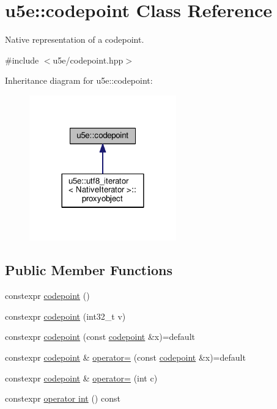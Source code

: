 \hypertarget{classu5e_1_1codepoint}{}\section{u5e\+:\+:codepoint Class Reference}
\label{classu5e_1_1codepoint}


Native representation of a codepoint.  




{\ttfamily \#include $<$u5e/codepoint.\+hpp$>$}



Inheritance diagram for u5e\+:\+:codepoint\+:
\nopagebreak
\begin{figure}[H]
\begin{center}
\leavevmode
\includegraphics[width=180pt]{classu5e_1_1codepoint__inherit__graph}
\end{center}
\end{figure}
\subsection*{Public Member Functions}
\begin{DoxyCompactItemize}
\item 
constexpr \hyperlink{classu5e_1_1codepoint_a6125584b5079e2ca72f4930e2890ac6d}{codepoint} ()
\item 
constexpr \hyperlink{classu5e_1_1codepoint_a2d033712b1118e34f32e067bf8c90e50}{codepoint} (int32\+\_\+t v)
\item 
constexpr \hyperlink{classu5e_1_1codepoint_a84c5769315b27a56cbf8c077d10c3f79}{codepoint} (const \hyperlink{classu5e_1_1codepoint}{codepoint} \&x)=default
\item 
constexpr \hyperlink{classu5e_1_1codepoint}{codepoint} \& \hyperlink{classu5e_1_1codepoint_a60cccd31a7d78336ffb226df79e2fb58}{operator=} (const \hyperlink{classu5e_1_1codepoint}{codepoint} \&x)=default
\item 
constexpr \hyperlink{classu5e_1_1codepoint}{codepoint} \& \hyperlink{classu5e_1_1codepoint_a06f7e693dc997163c98d9a42fb069b71}{operator=} (int c)
\item 
constexpr \hyperlink{classu5e_1_1codepoint_a62f2f28a2cd7c7f59a13e98deacf3249}{operator int} () const 
\end{DoxyCompactItemize}
